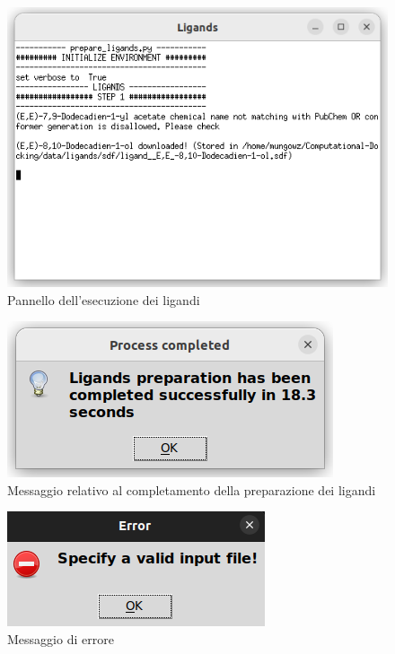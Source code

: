 \begin{figure}[H]
    \centering
    \includegraphics[scale=0.8]{immagini/capitolo3/ligandsExecution.png}
    \caption{Pannello dell'esecuzione dei ligandi}
    \label{fig:ligands execution}
\end{figure}

\begin{figure}[H]
    \centering
    \includegraphics{immagini/capitolo3/progressCompletedLigands.png}
    \caption{Messaggio relativo al completamento della preparazione dei ligandi}
    \label{fig:progress completed ligands}
\end{figure}

\begin{figure}[H]
    \centering
    \includegraphics{immagini/capitolo3/invalidInputLigands.png}
    \caption{Messaggio di errore}
    \label{fig:invalid input ligands}
\end{figure}

